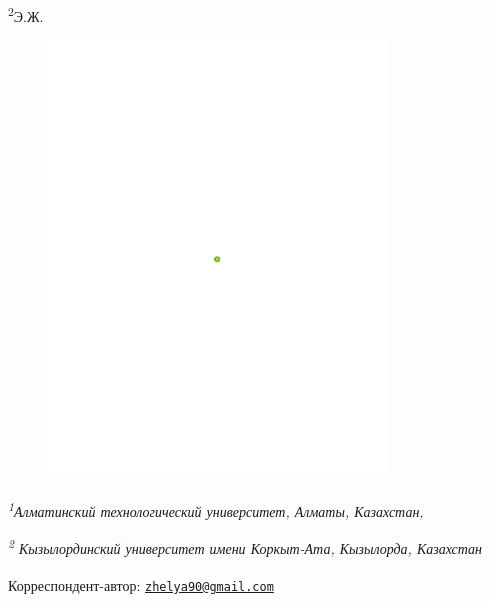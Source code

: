 {\textsuperscript{2}Э.Ж.
\begin{figure}[H]
	\centering
	\includegraphics[width=0.8\textwidth]{media/pish2/image2}
	\caption*{}
\end{figure}


\emph{\textsuperscript{1}Алматинский технологический университет,
Алматы, Казахстан,}

\emph{\textsuperscript{2} Кызылординский университет имени Коркыт-Ата,
Кызылорда, Казахстан}

{\bfseries \textsuperscript{\envelope }}Корреспондент-автор:
\href{mailto:zhelya90@gmail.com}{\nolinkurl{zhelya90@gmail.com}}

}
